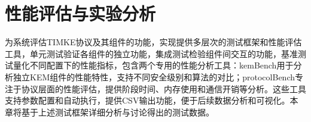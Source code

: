 \section{性能评估与实验分析}
\label{chap:performace}

为系统评估TIMKE协议及其组件的功能，实现提供多层次的测试框架和性能评估工具，单元测试验证各组件的独立功能，集成测试检验组件间交互的功能，基准测试量化不同配置下的性能指标，包含两个专用的性能分析工具：kemBench用于分析独立KEM组件的性能特性，支持不同安全级别和算法的对比；protocolBench专注于协议层面的性能评估，提供阶段时间、内存使用和通信开销等分析。这些工具支持参数配置和自动执行，提供CSV输出功能，便于后续数据分析和可视化。本章将基于上述测试框架详细分析与讨论得出的测试数据。


